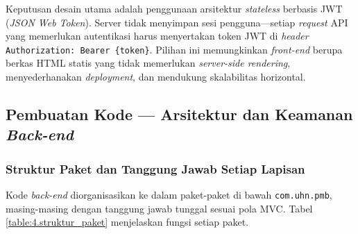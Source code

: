 Keputusan desain utama adalah penggunaan arsitektur \textit{stateless} berbasis JWT (\textit{JSON Web Token}). Server tidak menyimpan sesi pengguna---setiap \textit{request} API yang memerlukan autentikasi harus menyertakan token JWT di \textit{header} \texttt{Authorization: Bearer \{token\}}. Pilihan ini memungkinkan \textit{front-end} berupa berkas HTML statis yang tidak memerlukan \textit{server-side rendering}, menyederhanakan \textit{deployment}, dan mendukung skalabilitas horizontal.\par

\subsection{Pembuatan Kode --- Arsitektur dan Keamanan \textit{Back-end}} \label{IV.PembuatanKode}

\subsubsection{Struktur Paket dan Tanggung Jawab Setiap Lapisan}

Kode \textit{back-end} diorganisasikan ke dalam paket-paket di bawah \texttt{com.uhn.pmb}, masing-masing dengan tanggung jawab tunggal sesuai pola MVC. Tabel \ref{table:4.struktur_paket} menjelaskan fungsi setiap paket.\par

